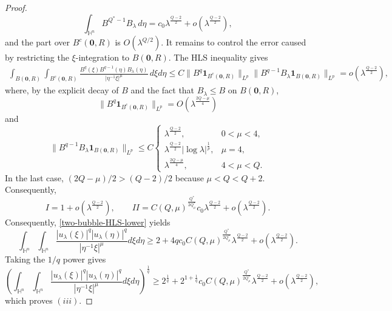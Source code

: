 \documentclass[11pt]{article}
\begin{document}
\begin{proof}
{\[
 \int_{\mathbb H^n}B^{Q^{\ast}-1}B_\lambda\,d\eta
 =c_0\lambda^{\frac{Q-2}{2}}+o\!\left(\lambda^{\frac{Q-2}{2}}\right),
\]
and the part over $B^c(\mathbf0,R)$ is $O(\lambda^{Q/2})$. It remains to control the error caused by restricting the $\xi$-integration to $B(\mathbf0,R)$. The HLS inequality gives
\begin{align*}
 \int_{B(\mathbf0,R)}\int_{B^c(\mathbf0,R)}
 \frac{B^q(\xi)B^{q-1}(\eta)B_\lambda(\eta)}{|\eta^{-1}\xi|^\mu}
 \,d\xi d\eta\leq C\|B^q\mathbf1_{B^c(\mathbf0,R)}\|_{L^p}
 \|B^{q-1}B_\lambda\mathbf1_{B(\mathbf0,R)}\|_{L^p}
 =o\!\left(\lambda^{\frac{Q-2}{2}}\right),
\end{align*}
where, by the explicit decay of $B$ and the fact that $B_\lambda\leq B$ on $B(\mathbf0,R)$,
\[
 \|B^q\mathbf1_{B^c(\mathbf0,R)}\|_{L^p}
 =O\!\left(\lambda^{\frac{2Q-\mu}{4}}\right)
\]
and
\[
 \|B^{q-1}B_\lambda\mathbf1_{B(\mathbf0,R)}\|_{L^p}
 \leq C\begin{cases}
 \lambda^{\frac{Q-2}{2}},&0<\mu<4,\\
 \lambda^{\frac{Q-2}{2}}|\log\lambda|^{\frac{1}{p}},&\mu=4,\\
 \lambda^{\frac{2Q-\mu}{4}},&4<\mu<Q.
 \end{cases}
\]
In the last case, $(2Q-\mu)/2>(Q-2)/2$ because $\mu<Q<Q+2$. Consequently,
\[
 I=1+o\!\left(\lambda^{\frac{Q-2}{2}}\right),\qquad
 II=C(Q,\mu)^{\frac{Q^{\ast}}{2Q^{\ast}_{\mu}}}c_0\lambda^{\frac{Q-2}{2}}
 +o\!\left(\lambda^{\frac{Q-2}{2}}\right).
\]
Consequently, \eqref{two-bubble-HLS-lower} yields
\[
 \int_{\mathbb{H}^{n}}\int_{\mathbb{H}^{n}}\frac{|u_\lambda(\xi)|^q|u_\lambda(\eta)|^q}{|\eta^{-1}\xi|^\mu}{d}\xi{d}\eta
 \geq 2+4q c_0C(Q,\mu)^{\frac{Q^{\ast}}{2Q^{\ast}_{\mu}}}\lambda^{\frac{Q-2}{2}}
 +o\!\left(\lambda^{\frac{Q-2}{2}}\right).
\]
Taking the $1/q$ power gives
\[
 \left(\int_{\mathbb{H}^{n}}\int_{\mathbb{H}^{n}}\frac{|u_\lambda(\xi)|^q|u_\lambda(\eta)|^q}{|\eta^{-1}\xi|^\mu}{d}\xi{d}\eta\right)^{\frac{1}{q}}
 \geq 2^{\frac{1}{q}}+2^{1+\frac{1}{q}}c_0C(Q,\mu)^{\frac{Q^{\ast}}{2Q^{\ast}_{\mu}}}\lambda^{\frac{Q-2}{2}}
 +o\!\left(\lambda^{\frac{Q-2}{2}}\right),
\]
which proves $(iii)$.}
\end{proof}
\end{document}
